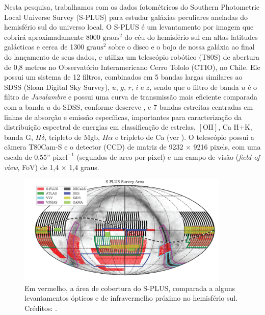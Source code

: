 Nesta pesquisa, trabalhamos com os dados fotométricos do Southern Photometric Local Universe Survey (S-PLUS) para estudar galáxias peculiares aneladas do hemisfério sul do universo local. O S-PLUS é um levantamento por imagem que cobrirá aproximadamente 8000 $\mathrm{graus}^{2}$ do céu do hemisfério sul em altas latitudes galácticas e cerca de 1300 $\mathrm{graus}^{2}$ sobre o disco e o bojo de nossa galáxia ao final do lançamento de seus dados, e utiliza um telescópio robótico (T80S) de abertura de 0,8 metros no Observatório Interamericano Cerro Tololo (CTIO), no Chile. Ele possui um sistema de 12 filtros, combinados em 5 bandas largas similares ao SDSS (Sloan Digital Sky Survey), $u$, $g$, $r$, $i$ e $z$, sendo que o filtro de banda $u$ é o filtro de \emph{Javalambre} e possui uma curva de transmissão mais eficiente comparada com a banda $u$ do SDSS, conforme descreve , e 7 bandas estreitas centradas em linhas de absorção e emissão específicas, importantes para caracterização da distribuição espectral de energias em classificação de estrelas, $[\text{OII}]$, Ca H+K, banda G, $H \delta$, tripleto de Mgb, $H \alpha$ e tripleto de Ca (ver ). O telescópio possui a câmera T80Cam-S e o detector (CCD) de matriz de 9232 × 9216 pixels, com uma escala de 0,55'' $\mathrm{pixel}^{-1}$ (segundos de arco por pixel) e um campo de visão (\emph{field of view}, FoV) de 1,4 × 1,4 graus.

\begin{figure}[h]
  \centering 
  \includegraphics[width=0.9\textwidth]{Imagens/surveyarea.PNG} 
  \caption[Área de cobertura do S-PLUS.]{Em vermelho, a área de cobertura do S-PLUS, comparada a alguns levantamentos ópticos e de infravermelho próximo no hemisfério sul. Créditos: .}
  \label{fig:surveyarea} 
\end{figure}

